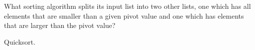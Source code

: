 What sorting algorithm splits its input list into two other lists,
	one which has all elements that are smaller than a given pivot value
	and one which has elements that are larger than the pivot value?

    \begin{answer}
    Quicksort.
    \end{answer}